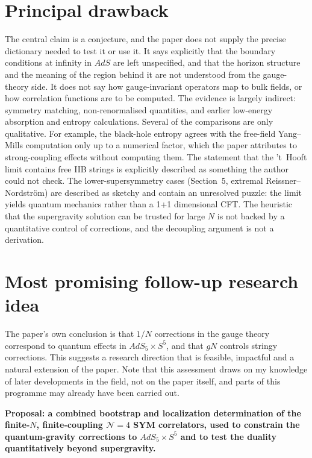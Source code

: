 \documentclass[11pt]{article}
\begin{document}
\section{Principal drawback}
The central claim is a conjecture, and the paper does not supply the precise dictionary needed to test it or use it. It says explicitly that the boundary conditions at infinity in $AdS$ are left unspecified, and that the horizon structure and the meaning of the region behind it are not understood from the gauge-theory side. It does not say how gauge-invariant operators map to bulk fields, or how correlation functions are to be computed. The evidence is largely indirect: symmetry matching, non-renormalised quantities, and earlier low-energy absorption and entropy calculations. Several of the comparisons are only qualitative. For example, the black-hole entropy agrees with the free-field Yang--Mills computation only up to a numerical factor, which the paper attributes to strong-coupling effects without computing them. The statement that the 't~Hooft limit contains free IIB strings is explicitly described as something the author could not check. The lower-supersymmetry cases (Section~5, extremal Reissner--Nordstr\"om) are described as sketchy and contain an unresolved puzzle: the limit yields quantum mechanics rather than a 1+1 dimensional CFT. The heuristic that the supergravity solution can be trusted for large $N$ is not backed by a quantitative control of corrections, and the decoupling argument is not a derivation.

\section{Most promising follow-up research idea}
The paper's own conclusion is that $1/N$ corrections in the gauge theory correspond to quantum effects in $AdS_5\times S^5$, and that $gN$ controls stringy corrections. This suggests a research direction that is feasible, impactful and a natural extension of the paper. Note that this assessment draws on my knowledge of later developments in the field, not on the paper itself, and parts of this programme may already have been carried out.

\textbf{Proposal: a combined bootstrap and localization determination of the finite-$N$, finite-coupling $\mathcal N=4$ SYM correlators, used to constrain the quantum-gravity corrections to $AdS_5\times S^5$ and to test the duality quantitatively beyond supergravity.}
\end{document}

